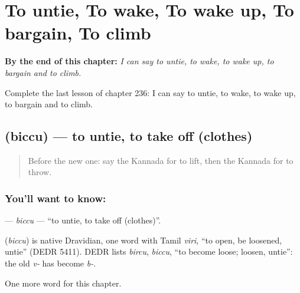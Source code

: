 
\chapter{To untie, To wake, To wake up, To bargain, To climb}
\label{ch:ka-to-untie-to-wake-to-wake-up-to-bargain-to-climb}

\begin{chapteropening}
\textbf{By the end of this chapter:} \emph{I can say to untie, to wake, to wake up, to bargain and to climb.}

Complete the last lesson of chapter 236: I can say to untie, to wake, to wake up, to bargain and to climb.
\end{chapteropening}

\section[\texorpdfstring{\kn{ಬಿಚ್ಚು} (biccu)}{ಬಿಚ್ಚು (biccu)}]{ (biccu) — to untie, to take off (clothes)}

\label{lesson:KA-C236-biccu}



\begin{quote}
Before the new one: say the Kannada for to lift, then the Kannada for to throw.
\end{quote}

\subsection*{You'll want to know: }
\textbf{} — \emph{biccu} — \textquotedblleft{}to untie, to take off (clothes)\textquotedblright{}.

\begin{cousinweb}
\textbf{} (\emph{biccu}) is native Dravidian, one word with Tamil \emph{viri}, \textquotedblleft{}to open, be loosened, untie\textquotedblright{} (DEDR 5411). DEDR lists \emph{bircu}, \emph{biccu}, \textquotedblleft{}to become loose; loosen, untie\textquotedblright{}: the old \emph{v-} has become \emph{b-}.
\end{cousinweb}

\begin{grammarlens}[title={What you've built}]
One more word for this chapter.
\end{grammarlens}

